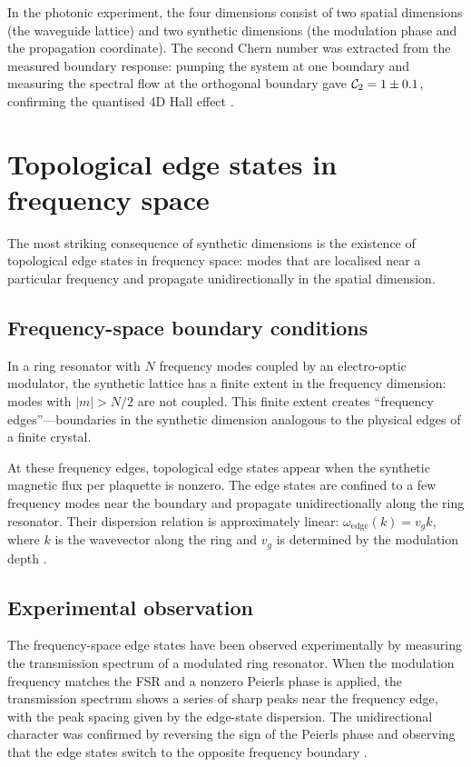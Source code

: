 In the photonic experiment, the four dimensions consist of two
spatial dimensions (the waveguide lattice) and two synthetic
dimensions (the modulation phase and the propagation coordinate).
The second Chern number was extracted from the measured boundary
response: pumping the system at one boundary and measuring the
spectral flow at the orthogonal boundary gave
$\mathcal{C}_2=1\pm 0.1$, confirming the quantised 4D Hall effect
\cite{price2022roadmap,ozawa2018topological}.

\section{Topological edge states in frequency space}
\label{sec:ch16-freq-edge}

The most striking consequence of synthetic dimensions is the
existence of topological edge states in frequency space: modes that
are localised near a particular frequency and propagate
unidirectionally in the spatial dimension.

\subsection{Frequency-space boundary conditions}
\label{sec:ch16-freq-boundary}

In a ring resonator with $N$ frequency modes coupled by an
electro-optic modulator, the synthetic lattice has a finite extent in
the frequency dimension: modes with $|m|>N/2$ are not coupled.  This
finite extent creates ``frequency edges''---boundaries in the
synthetic dimension analogous to the physical edges of a finite
crystal.

At these frequency edges, topological edge states appear when the
synthetic magnetic flux per plaquette is nonzero.  The edge states
are confined to a few frequency modes near the boundary and propagate
unidirectionally along the ring resonator.  Their dispersion relation
is approximately linear: $\omega_{\mathrm{edge}}(k)=v_g k$, where
$k$ is the wavevector along the ring and $v_g$ is determined by the
modulation depth \cite{ozawa2018topological,price2022roadmap}.

\subsection{Experimental observation}
\label{sec:ch16-freq-edge-expt}

The frequency-space edge states have been observed experimentally by
measuring the transmission spectrum of a modulated ring resonator.
When the modulation frequency matches the FSR and a nonzero Peierls
phase is applied, the transmission spectrum shows a series of sharp
peaks near the frequency edge, with the peak spacing given by the
edge-state dispersion.  The unidirectional character was confirmed by
reversing the sign of the Peierls phase and observing that the
edge states switch to the opposite frequency boundary
\cite{ozawa2018topological}.

